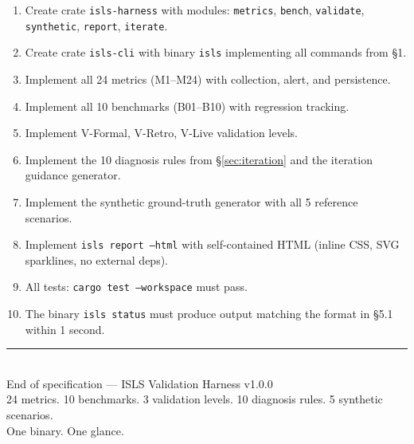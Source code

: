 \documentclass[10pt,a4paper]{article}
\begin{document}
\begin{harnessbox}
\small
\begin{enumerate}[nosep]
\item Create crate \texttt{isls-harness} with modules: \texttt{metrics}, \texttt{bench}, \texttt{validate}, \texttt{synthetic}, \texttt{report}, \texttt{iterate}.
\item Create crate \texttt{isls-cli} with binary \texttt{isls} implementing all commands from \S1.
\item Implement all 24 metrics (M1--M24) with collection, alert, and persistence.
\item Implement all 10 benchmarks (B01--B10) with regression tracking.
\item Implement V-Formal, V-Retro, V-Live validation levels.
\item Implement the 10 diagnosis rules from \S\ref{sec:iteration} and the iteration guidance generator.
\item Implement the synthetic ground-truth generator with all 5 reference scenarios.
\item Implement \texttt{isls report --html} with self-contained HTML (inline CSS, SVG sparklines, no external deps).
\item All tests: \texttt{cargo test --workspace} must pass.
\item The binary \texttt{isls status} must produce output matching the format in \S5.1 within 1 second.
\end{enumerate}
\end{harnessbox}

\vspace{0.5cm}
\begin{center}
\rule{0.6\textwidth}{0.3pt}\\[0.3cm]
{\small End of specification — ISLS Validation Harness v1.0.0}\\[2pt]
{\scriptsize 24 metrics. 10 benchmarks. 3 validation levels. 10 diagnosis rules. 5 synthetic scenarios.\\One binary. One glance.}
\end{center}
\end{document}
